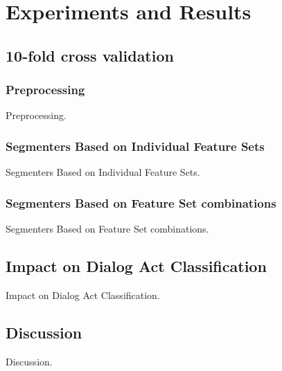 
\chapter{Experiments and Results}

\section{10-fold cross validation}

\subsection{Preprocessing}

Preprocessing.

\subsection{Segmenters Based on Individual Feature Sets}

Segmenters Based on Individual Feature Sets.

\subsection{Segmenters Based on Feature Set combinations}

Segmenters Based on Feature Set combinations.

\section{Impact on Dialog Act Classification}

Impact on Dialog Act Classification.

\section{Discussion}

Discussion.